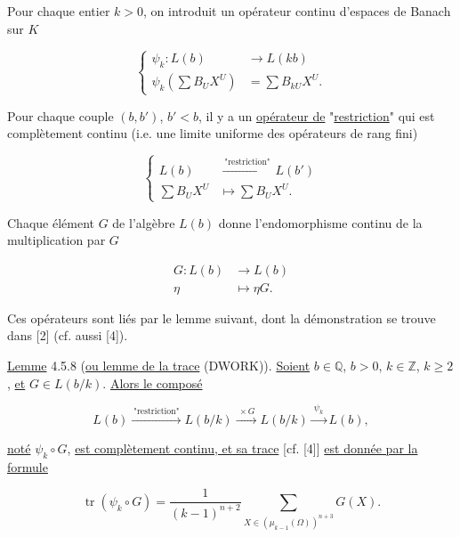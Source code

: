 Pour chaque entier $k>0$, on introduit un opérateur continu d'espaces de
Banach sur $K$

\begin{equation}\tag{4.5.5}
\left\{
\begin{aligned}
\psi_k:L(b)&\longrightarrow L(kb)\\
\psi_k\!\left(\sum B_UX^U\right)&=\sum B_{kU}X^U.
\end{aligned}
\right.
\end{equation}

Pour chaque couple $(b,b')$, $b'<b$, il y a un
\underline{opérateur de} "\underline{restriction}" qui est complètement continu
(i.e. une limite uniforme des opérateurs de rang fini)

\begin{equation}\tag{4.5.6}
\left\{
\begin{aligned}
L(b)&\xrightarrow{\ \text{"restriction"}\ }L(b')\\
\sum B_UX^U&\longmapsto\sum B_UX^U.
\end{aligned}
\right.
\end{equation}

Chaque élément $G$ de l'algèbre $L(b)$ donne l'endomorphisme continu de la
multiplication par $G$

\begin{equation}\tag{4.5.7}
\begin{aligned}
G:L(b)&\longrightarrow L(b)\\
\eta&\longmapsto\eta G.
\end{aligned}
\end{equation}

Ces opérateurs sont liés par le lemme suivant, dont la démonstration se
trouve dans [2] (cf. aussi [4]).


\underline{Lemme} 4.5.8 (\underline{ou lemme de la trace} (DWORK)).
\underline{Soient} $b\in\mathbb Q$, $b>0$, $k\in\mathbb Z$, $k\geq2$, \underline{et}
$G\in L(b/k)$. \underline{Alors le composé}

\[
L(b)\xrightarrow{\ \text{"restriction"}\ }L(b/k)
\xrightarrow{\ \times G\ }L(b/k)
\xrightarrow{\ \psi_k\ }L(b),
\]

\underline{noté} $\psi_k\circ G$, \underline{est complètement continu, et sa trace}
[cf. [4]] \underline{est donnée par la formule}

\begin{equation}\tag{4.5.9}
\operatorname{tr}(\psi_k\circ G)
=\frac1{(k-1)^{n+2}}
\sum_{X\in(\mu_{k-1}(\Omega))^{n+3}}G(X).
\end{equation}

